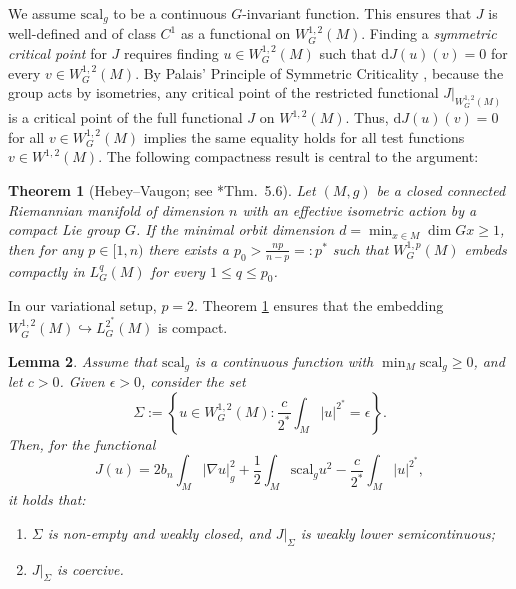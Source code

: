 \documentclass[12pt,a4paper]{amsart}
\theoremstyle{plain}
\newtheorem{theorem}{Theorem}[section]
\newtheorem{lemma}[theorem]{Lemma}
\theoremstyle{definition}
\theoremstyle{remark}
\newcommand{\ga}{\mathit{g}} %
\begin{document}
We assume $\mathrm{scal}_{\ga}$ to be a continuous $G$-invariant function. This ensures that $J$ is well-defined and of class $C^1$ as a functional on $W^{1,2}_G(M)$. Finding a \emph{symmetric critical point} for $J$ requires finding $u\in W^{1,2}_G(M)$ such that $\mathrm{d} J(u)(v) = 0$ for every $v\in W^{1,2}_G(M)$. By Palais' Principle of Symmetric Criticality \cite{palais1979}, because the group acts by isometries, any critical point of the restricted functional $J|_{W^{1,2}_G(M)}$ is a critical point of the full functional $J$ on $W^{1,2}(M)$. Thus, $\mathrm{d} J(u)(v)=0$ for all $v\in W^{1,2}_G(M)$ implies the same equality holds for all test functions $v\in W^{1,2}(M)$. The following compactness result is central to the argument:

\begin{theorem}[Hebey--Vaugon; see {\cite{hebey1996sobolev}*{Thm.~5.6}}]\label{thm:largerembedings}
Let $(M,\ga)$ be a closed connected Riemannian manifold of dimension $n$ with an effective isometric action by a compact Lie group $G$. If the minimal orbit dimension $d = \min_{x\in M}\dim Gx \geq 1$, then for any $p \in [1,n)$ there exists a $p_0 > \frac{np}{n-p} =: p^*$ such that $W^{1,p}_G(M)$ embeds compactly in $L^q_G(M)$ for every $1 \leq q \leq p_0$. 
\end{theorem}

In our variational setup, $p=2$. Theorem \ref{thm:largerembedings} ensures that the embedding $W^{1,2}_G(M) \hookrightarrow L^{2^*}_G(M)$ is compact.

\begin{lemma}\label{lem:criticalpoint}
    Assume that $\mathrm{scal}_{\ga}$ is a continuous function with $\min_M\mathrm{scal}_{\ga} \geq 0$, and let $c > 0$. Given $\epsilon > 0$, consider the set
    \begin{equation}
        \Sigma := \left\{u \in W^{1,2}_G(M) : \frac{c}{2^*}\int_M |u|^{2^*} = \epsilon \right\}.
    \end{equation}
    Then, for the functional
    \begin{equation}
     J(u) = 2b_n\int_M|\nabla u|_{\ga}^2 + \frac{1}{2}\int_M\mathrm{scal}_{\ga}u^2
       - \frac{c}{2^*}\int_M |u|^{2^*},
    \end{equation}
    it holds that:
    \begin{enumerate}
        \item $\Sigma$ is non-empty and weakly closed, and $J|_{{\Sigma}}$ is weakly lower semicontinuous;
        \item $J|_{\Sigma}$ is coercive.
    \end{enumerate}
\end{lemma}
\end{document}
